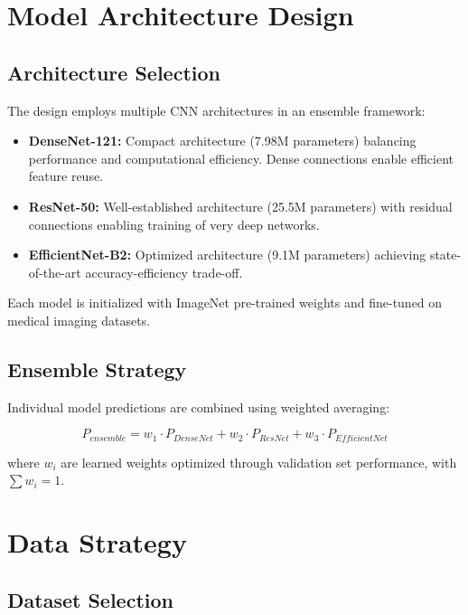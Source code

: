 {\section{Model Architecture Design}

\subsection{Architecture Selection}

The design employs multiple CNN architectures in an ensemble framework:

\begin{itemize}
    \item \textbf{DenseNet-121:} Compact architecture (7.98M parameters) balancing performance and computational efficiency. Dense connections enable efficient feature reuse.
    \item \textbf{ResNet-50:} Well-established architecture (25.5M parameters) with residual connections enabling training of very deep networks.
    \item \textbf{EfficientNet-B2:} Optimized architecture (9.1M parameters) achieving state-of-the-art accuracy-efficiency trade-off.
\end{itemize}

Each model is initialized with ImageNet pre-trained weights and fine-tuned on medical imaging datasets.

\subsection{Ensemble Strategy}

Individual model predictions are combined using weighted averaging:

\begin{equation}
P_{ensemble} = w_1 \cdot P_{DenseNet} + w_2 \cdot P_{ResNet} + w_3 \cdot P_{EfficientNet}
\end{equation}

where $w_i$ are learned weights optimized through validation set performance, with $\sum w_i = 1$.

\section{Data Strategy}

\subsection{Dataset Selection}

}
